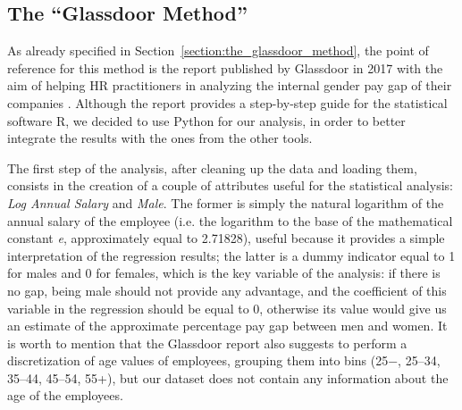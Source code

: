 \subsection{The ``Glassdoor Method''}
As already specified in Section~\ref{section:the_glassdoor_method}, the point of reference for this method is the report published by Glassdoor in 2017 with the aim of helping HR practitioners in analyzing the internal gender pay gap of their companies \cite{chamberlain2017analyze}. Although the report provides a step-by-step guide for the statistical software R, we decided to use Python for our analysis, in order to better integrate the results with the ones from the other tools.

The first step of the analysis, after cleaning up the data and loading them, consists in the creation of a couple of attributes useful for the statistical analysis: \textit{Log Annual Salary} and \textit{Male}. The former is simply the natural logarithm of the annual salary of the employee (i.e. the logarithm to the base of the mathematical constant \textit{e}, approximately equal to 2.71828), useful because it provides a simple interpretation of the regression results; the latter is a dummy indicator equal to 1 for males and 0 for females, which is the key variable of the analysis: if there is no gap, being male should not provide any advantage, and the coefficient of this variable in the regression should be equal to 0, otherwise its value would give us an estimate of the approximate percentage pay gap between men and women. It is worth to mention that the Glassdoor report also suggests to perform a discretization of age values of employees, grouping them into bins (25\(-\), 25--34, 35--44, 45--54, 55+), but our dataset does not contain any information about the age of the employees.


